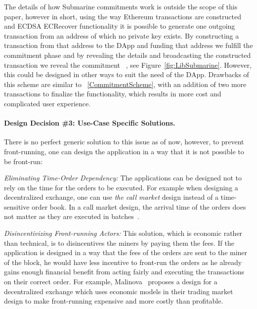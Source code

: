 The details of how Submarine commitments work is outside the scope of this paper, however in short, using the way Ethereum transactions are constructed and ECDSA ECRecover functionality it is possible to generate one outgoing transaction from an address of which no private key exists. By constructing a transaction from that address to the DApp and funding that address we fulfill the commitment phase and by revealing the details and broadcasting the constructed transaction we reveal the commitment ~\cite{libsubmarine}, see Figure~\ref{fig:LibSubmarine}. However, this could be designed in other ways to suit the need of the DApp. Drawbacks of this scheme are similar to ~\ref{CommitmentScheme}, with an addition of two more transactions to finalize the functionality, which results in more cost and complicated user experience.

\paragraph{Design Decision \#3: Use-Case Specific Solutions.}
There is no perfect generic solution to this issue as of now, however, to prevent front-running, one can design the application in a way that it is not possible to be front-run:

\begin{compactlist}

\item \emph{Eliminating Time-Order Dependency:} The applications can be designed not to rely on the time for the orders to be executed. For example when designing a decentralized exchange, one can use \emph{the call market} design instead of a time-sensitive order book. In a call market design, the arrival time of the orders does not matter as they are executed in batches~\cite{clark2014decentralizing}. 

\item \emph{Disincentivizing Front-running Actors:} This solution, which is economic rather than technical, is to disincentives the miners by paying them the fees. If the application is designed in a way that the fees of the orders are sent to the miner of the block, he would have less incentive to front-run the orders as he already gains enough financial benefit from acting fairly and executing the transactions on their correct order. For example, Malinova~\cite{malinova2017market} proposes a design for a decentralized exchange which uses economic models in their trading market design to make front-running expensive and more costly than profitable. 

 \end{compactlist}


